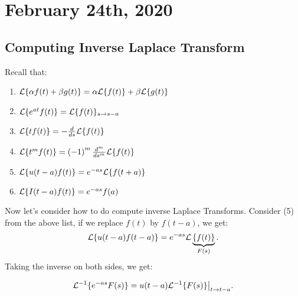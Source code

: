\documentclass[../main/main.tex]{subfiles}
\begin{document}
\section{February 24th, 2020}
\subsection{Computing Inverse Laplace Transform}
Recall that: 
\begin{enumerate}
	\item $ \mathcal{L} \{\alpha f(t) + \beta g(t)\} =\alpha\mathcal{L} \{f(t)\} +\beta\mathcal{L} \{g(t)\} $
	\item $\mathcal{L} \{e^{a t}f(t) \} = \mathcal{L} \{f(t)\}_{s\to s-a}$
	\item $\mathcal{L} \{tf(t)\} = - \frac{d}{ds}\mathcal{L} \{f(t)\} $
	\item $\mathcal{L} \{t^m f(t)\} = \left( -1 \right) ^{m} \frac{d^{m}}{ds^m}\mathcal{L} \{f(t)\} $
	\item $\mathcal{L} \{u(t-a) f(t)\} = e^{-as}\mathcal{L} \{f(t+a)\} $
	\item $\mathcal{L} \{I(t-a)f(t)\}= e^{-as}f(a)$
\end{enumerate}
Now let's consider how to do compute inverse Laplace Transforms. Consider (5) from the above list, if we replace $f(t)$ by $f(t-a)$, we get: \[
	\mathcal{L} \{u(t-a)f(t-a)\} =e^{-as}\mathcal{L} \underbrace{\{f(t)\} }_{F(s)}
.\] Taking the inverse on both sides, we get: 
\begin{theorem} 
\[
\mathcal{L} ^{-1} \{e^{-as}F(s)\} = u(t-a) \mathcal{L} ^{-1} \{F(s)\} \big\rvert_{t\to t-a}
.\] 
\end{theorem}
\end{document}
